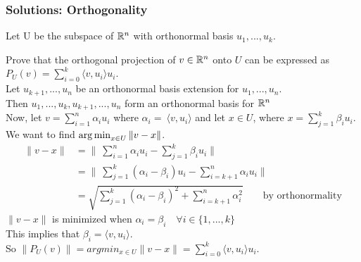 \documentclass{beamer}
\newcommand\fonteight{\fontsize{8}{9.6}\selectfont}
\renewenvironment{enumerate}%
{\begin{list}{\arabic{enumi}.}%
      {\setlength{\leftmargin}{2.5em}%
       \setlength{\itemsep}{-\parsep}%
       \setlength{\topsep}{-\parskip}%
       \usecounter{enumi}}%
 }{\end{list}}
\begin{document}
\setlength{\abovedisplayskip}{0pt}%
\setlength{\belowdisplayskip}{0pt}%
\setlength{\abovedisplayshortskip}{0pt}%
\setlength{\belowdisplayshortskip}{0pt}%
\setlength{\jot}{0pt}
\begin{frame}
\frametitle{Solutions: Orthogonality}

\begin{solution}
\fonteight
Let U be the subspace of $\mathbb{R}^n$ with orthonormal basis $u_1,...,u_k$.
\begin{enumerate}
\item[2i.] Prove that the orthogonal projection of $v \in \mathbb{R}^n$ onto $U$ can be expressed as $P_U(v)  = \sum_{i=0}^k  \langle v,u_i \rangle u_i$. \\

Let $u_{k+1},...,u_n$ be an orthonormal basis extension for $ u_1,...,u_n$.\\
Then $u_1,...,u_k,u_{k+1},...,u_n$ form an orthonormal basis for $\mathbb{R}^n$\\
Now, let $v = \sum_{i=1}^n \alpha_i u_i$ where $\alpha_i=\  \langle v,u_i \rangle $ and let $x\in U$, where $x=\sum_{j=1}^k  \beta_i u_i$.\\
We want to find $\operatorname*{arg\,min}_{x\in U} \|v-x\|$.
\begin{align*}
 \|v-x\| &= \|\ \sum_{i=1}^n \alpha_i u_i - \sum_{j=1}^k  \beta_i u_i \| \\
         &= \|\ \sum_{j=1}^k (\alpha_i-\beta_i) u_i - \sum_{i=k+1}^n  \alpha_i u_i \| \\
         &= \sqrt{\sum_{j=1}^k (\alpha_i-\beta_i)^2 + \sum_{i=k+1}^n  \alpha_i^2} \qquad \text{by orthonormality}
\end{align*}
$\|v-x\|$ is minimized when $\alpha_i = \beta_i \quad \forall i \in \{1,...,k\}$\\
This implies that $\beta_i =  \langle v,u_i \rangle $.\\
 So $\|P_U(v)\|=argmin_{x\in U}\|v-x\| = \sum_{i=0}^k  \langle v,u_i \rangle u_i$.
\end{enumerate}
\end{solution}
\end{frame}
\end{document}
